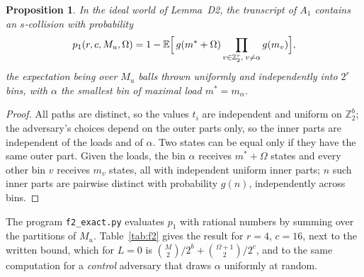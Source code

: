 \documentclass[11pt,a4paper]{article}
\newtheorem{proposition}{Proposition}
\theoremstyle{definition}
\theoremstyle{remark}
\newcommand{\Z}{\mathbb{Z}}
\newcommand{\E}{\mathbb{E}}
\newcommand{\file}[1]{\texttt{#1}}
\begin{document}
\begin{proposition}\label{prop:f2}
In the ideal world of Lemma~D2, the transcript of $A_1$ contains an $s$-collision with probability
\[ p_1(r, c, M_u, \Omega) = 1 - \E\Bigl[\, g(m^* + \Omega) \prod_{v \in \Z_2^r,\; v \ne \alpha} g(m_v) \Bigr], \]
the expectation being over $M_u$ balls thrown uniformly and independently into $2^r$ bins, with $\alpha$ the
smallest bin of maximal load $m^* = m_\alpha$.
\end{proposition}
\begin{proof}
All paths are distinct, so the values $t_i$ are independent and uniform on $\Z_2^b$; the adversary's choices depend on
the outer parts only, so the inner parts are independent of the loads and of $\alpha$. Two states can be equal only if
they have the same outer part. Given the loads, the bin $\alpha$ receives $m^* + \Omega$ states and every other bin $v$
receives $m_v$ states, all with independent uniform inner parts; $n$ such inner parts are pairwise distinct with
probability $g(n)$, independently across bins.
\end{proof}
The program \file{f2\_exact.py} evaluates $p_1$ with rational numbers by summing over the partitions of $M_u$.
Table~\ref{tab:f2} gives the result for $r = 4$, $c = 16$, next to the written bound, which for $L = 0$ is
$\binom{M}{2}/2^b + \binom{\Omega+1}{2}/2^c$, and to the same computation for a \emph{control} adversary that draws
$\alpha$ uniformly at random.
\end{document}

